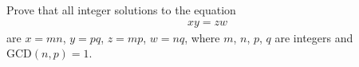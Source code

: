 Prove that all integer solutions to the equation
\begin{align*}
xy = zw
\end{align*}
are $x=mn$, $y=pq$, $z=mp$, $w=nq$, where $m$, $n$, $p$, $q$ are integers and $\text{GCD}(n,p)=1$.  
